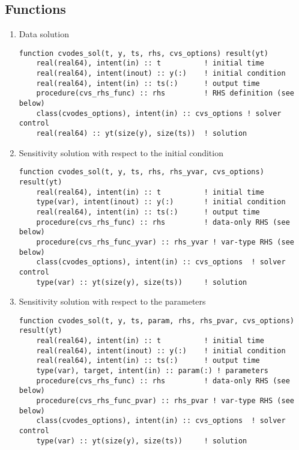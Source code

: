 \documentclass[12pt, reqno, oneside]{amsbook}
\numberwithin{equation}{chapter}
\begin{document}
\subsection{Functions}
\label{sec:orgf1d1100}
\begin{enumerate}
\item Data solution
\label{sec:org271df10}
\begin{verbatim}
function cvodes_sol(t, y, ts, rhs, cvs_options) result(yt)
    real(real64), intent(in) :: t          ! initial time
    real(real64), intent(inout) :: y(:)    ! initial condition
    real(real64), intent(in) :: ts(:)      ! output time
    procedure(cvs_rhs_func) :: rhs         ! RHS definition (see below)
    class(cvodes_options), intent(in) :: cvs_options ! solver control
    real(real64) :: yt(size(y), size(ts))  ! solution
\end{verbatim}

\item Sensitivity solution  with respect to the initial condition
\label{sec:orgf19dcad}
\begin{verbatim}
function cvodes_sol(t, y, ts, rhs, rhs_yvar, cvs_options) result(yt)
    real(real64), intent(in) :: t          ! initial time
    type(var), intent(inout) :: y(:)       ! initial condition
    real(real64), intent(in) :: ts(:)      ! output time
    procedure(cvs_rhs_func) :: rhs         ! data-only RHS (see below)
    procedure(cvs_rhs_func_yvar) :: rhs_yvar ! var-type RHS (see below)
    class(cvodes_options), intent(in) :: cvs_options  ! solver control
    type(var) :: yt(size(y), size(ts))     ! solution
\end{verbatim}

\item Sensitivity solution  with respect to the parameters
\label{sec:org64f810b}
\begin{verbatim}
function cvodes_sol(t, y, ts, param, rhs, rhs_pvar, cvs_options) result(yt)
    real(real64), intent(in) :: t          ! initial time
    real(real64), intent(inout) :: y(:)    ! initial condition
    real(real64), intent(in) :: ts(:)      ! output time
    type(var), target, intent(in) :: param(:) ! parameters
    procedure(cvs_rhs_func) :: rhs         ! data-only RHS (see below)
    procedure(cvs_rhs_func_pvar) :: rhs_pvar ! var-type RHS (see below)
    class(cvodes_options), intent(in) :: cvs_options  ! solver control
    type(var) :: yt(size(y), size(ts))     ! solution
\end{verbatim}


\end{enumerate}
\end{document}
